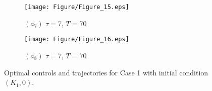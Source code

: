 \documentclass[10pt,letterpaper]{article}
\begin{document}
\begin{figure}[H]
    \begin{subfigure}[t]{0.48\textwidth}
        \centering
        \texttt{[image: Figure/Figure\_15.eps]}
        \par\vspace{1pt} $(a_7)$ $\tau = 7$, $T = 70$
    \end{subfigure}
    \hfill
    \begin{subfigure}[t]{0.48\textwidth}
        \centering
        \texttt{[image: Figure/Figure\_16.eps]}
        \par\vspace{1pt} $(a_8)$ $\tau = 7$, $T = 70$
    \end{subfigure}

    \hspace{1pt}\caption{Optimal controls and trajectories for Case 1 with initial condition $(K_1,0)$.}
    \label{fig:5}
\end{figure}
\end{document}
